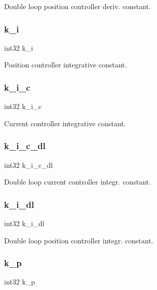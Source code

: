 Double loop position controller deriv. constant. \mbox{\label{structst__mem_ad62fb8a39e2de160e14be47e3ff08014}} 
\subsubsection{k\+\_\+i}
{\footnotesize\ttfamily int32 k\+\_\+i}

Position controller integrative constant. \mbox{\label{structst__mem_a942ea80eb197a70dd0ba3da33d1e6c6e}} 
\subsubsection{k\+\_\+i\+\_\+c}
{\footnotesize\ttfamily int32 k\+\_\+i\+\_\+c}

Current controller integrative constant. \mbox{\label{structst__mem_afc912f90d6ba2f39046a0daf0207f116}} 
\subsubsection{k\+\_\+i\+\_\+c\+\_\+dl}
{\footnotesize\ttfamily int32 k\+\_\+i\+\_\+c\+\_\+dl}

Double loop current controller integr. constant. \mbox{\label{structst__mem_ab5c86695ff730d3387a8c6b089945a7e}} 
\subsubsection{k\+\_\+i\+\_\+dl}
{\footnotesize\ttfamily int32 k\+\_\+i\+\_\+dl}

Double loop position controller integr. constant. \mbox{\label{structst__mem_ad1bc394122aa9760c3fc2887a1891cd8}} 
\subsubsection{k\+\_\+p}
{\footnotesize\ttfamily int32 k\+\_\+p}

